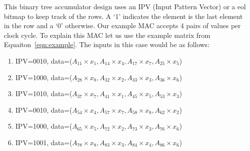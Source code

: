 \par This binary tree accumulator design uses an IPV (Input Pattern Vector) or a eol bitmap to keep track of the rows. A `1' indicates the element is the last element in the row and a `0' otherwise. Our example MAC accepts 4 pairs of values per clock cycle. To explain this MAC let us use the example matrix from Equaiton~\ref{eqn:example}. The inputs in this case would be as follows:
\begin{enumerate}
    \item IPV=0010, data=($A_{11}\times x_1, A_{14}\times x_4, A_{17}\times x_7, A_{25}\times x_5$)
    \item IPV=1000, data=($A_{28}\times x_8, A_{32}\times x_2, A_{33}\times x_3, A_{36}\times x_6$)
    \item IPV=1010, data=($A_{37}\times x_7, A_{41}\times x_1, A_{45}\times x_5, A_{53}\times x_3$)
    \item IPV=0010, data=($A_{54}\times x_4, A_{57}\times x_7, A_{58}\times x_8, A_{62}\times x_2$)
    \item IPV=1000, data=($A_{65}\times x_5, A_{72}\times x_2, A_{73}\times x_3, A_{76}\times x_6$)
    \item IPV=1001, data=($A_{78}\times x_8, A_{83}\times x_3, A_{84}\times x_4, A_{86}\times x_6$)
\end{enumerate}
